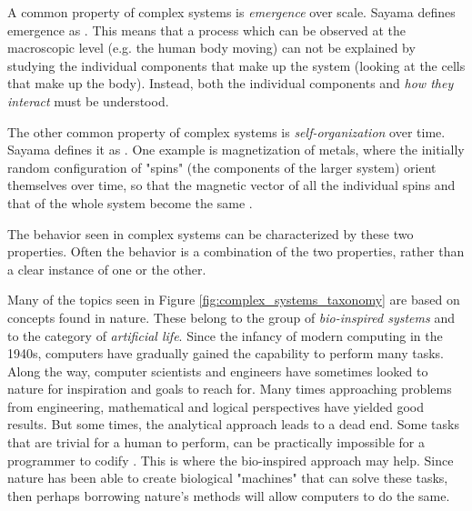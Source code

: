 A common property of complex systems is \textit{emergence} over scale.
Sayama defines emergence as .
This means that a process which can be observed at the macroscopic level (e.g. the human body moving) can not be explained by studying the individual components that make up the system (looking at the cells that make up the body).
Instead, both the individual components and \textit{how they interact} must be understood.

The other common property of complex systems is \textit{self-organization} over time.
Sayama defines it as .
One example is magnetization of metals, where the initially random configuration of "spins" (the components of the larger system) orient themselves over time,
so that the magnetic vector of all the individual spins and that of the whole system become the same \cite{heylighen2001science}.

The behavior seen in complex systems can be characterized by these two properties.
Often the behavior is a combination of the two properties, rather than a clear instance of one or the other.


Many of the topics seen in Figure \ref{fig:complex_systems_taxonomy} are based on concepts found in nature.
These belong to the group of \textit{bio-inspired systems} and to the category of \textit{artificial life}.
Since the infancy of modern computing in the 1940s, computers have gradually gained the capability to perform many tasks.
Along the way, computer scientists and engineers have sometimes looked to nature for inspiration and goals to reach for.
Many times approaching problems from engineering, mathematical and logical perspectives have yielded good results.
But some times, the analytical approach leads to a dead end.
Some tasks that are trivial for a human to perform, can be practically impossible for a programmer to codify \cite{moravec1988mind}.
This is where the bio-inspired approach may help.
Since nature has been able to create biological "machines" that can solve these tasks, then perhaps borrowing nature's methods will allow computers to do the same.

